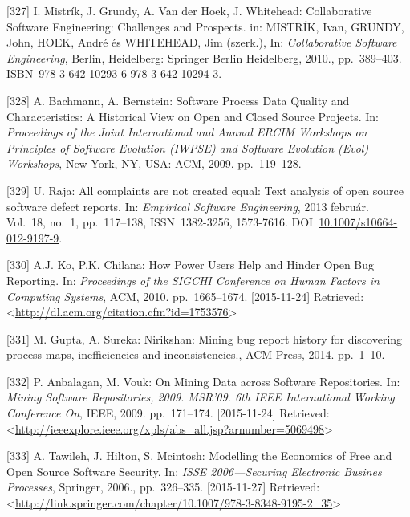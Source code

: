 \documentclass[12pt,magyar,a4paper,oneside]{scrreprt}
\begin{document}
\leavevmode\hypertarget{ref-mistrik_collaborative_2010}{}%
{[}327{]} I. Mistrík, J. Grundy, A. Van der Hoek, J. Whitehead:
Collaborative Software Engineering: Challenges and Prospects. in:
MISTRÍK, Ivan, GRUNDY, John, HOEK, André és WHITEHEAD, Jim (szerk.), In:
\emph{Collaborative Software Engineering}, Berlin, Heidelberg: Springer
Berlin Heidelberg, 2010., pp.~389--403.
ISBN~\href{https://worldcat.org/isbn/978-3-642-10293-6\%20978-3-642-10294-3}{978-3-642-10293-6 978-3-642-10294-3}.

\leavevmode\hypertarget{ref-bachmann_software_2009}{}%
{[}328{]} A. Bachmann, A. Bernstein: Software Process Data Quality and
Characteristics: A Historical View on Open and Closed Source Projects.
In: \emph{Proceedings of the Joint International and Annual ERCIM
Workshops on Principles of Software Evolution (IWPSE) and Software
Evolution (Evol) Workshops}, New York, NY, USA: ACM, 2009. pp.~119--128.

\leavevmode\hypertarget{ref-raja_all_2013}{}%
{[}329{]} U. Raja: All complaints are not created equal: Text analysis
of open source software defect reports. In: \emph{Empirical Software
Engineering}, 2013 február. Vol.~18, no.~1, pp.~117--138,
ISSN~1382-3256, 1573-7616.
DOI~\href{https://doi.org/10.1007/s10664-012-9197-9}{10.1007/s10664-012-9197-9}.

\leavevmode\hypertarget{ref-ko_how_2010}{}%
{[}330{]} A.J. Ko, P.K. Chilana: How Power Users Help and Hinder Open
Bug Reporting. In: \emph{Proceedings of the SIGCHI Conference on Human
Factors in Computing Systems}, ACM, 2010. pp.~1665--1674.
{[}2015-11-24{]} Retrieved:
\textless{}\url{http://dl.acm.org/citation.cfm?id=1753576}\textgreater{}

\leavevmode\hypertarget{ref-gupta_nirikshan_2014}{}%
{[}331{]} M. Gupta, A. Sureka: Nirikshan: Mining bug report history for
discovering process maps, inefficiencies and inconsistencies., ACM
Press, 2014. pp.~1--10.

\leavevmode\hypertarget{ref-anbalagan_mining_2009}{}%
{[}332{]} P. Anbalagan, M. Vouk: On Mining Data across Software
Repositories. In: \emph{Mining Software Repositories, 2009. MSR'09. 6th
IEEE International Working Conference On}, IEEE, 2009. pp.~171--174.
{[}2015-11-24{]} Retrieved:
\textless{}\url{http://ieeexplore.ieee.org/xpls/abs_all.jsp?arnumber=5069498}\textgreater{}

\leavevmode\hypertarget{ref-tawileh_modelling_2006}{}%
{[}333{]} A. Tawileh, J. Hilton, S. Mcintosh: Modelling the Economics of
Free and Open Source Software Security. In: \emph{ISSE 2006---Securing
Electronic Busines Processes}, Springer, 2006., pp.~326--335.
{[}2015-11-27{]} Retrieved:
\textless{}\url{http://link.springer.com/chapter/10.1007/978-3-8348-9195-2_35}\textgreater{}
\end{document}
